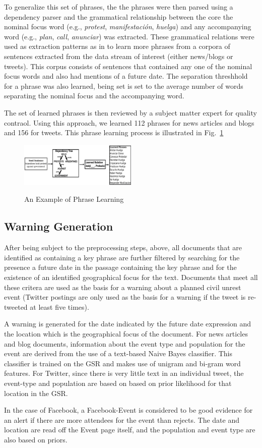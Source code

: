 To generalize this set of phrases, the the phrases were then parsed
using a dependency parser \cite{freeling} and the grammatical
relationship between the core the nominal focus word (e.g., {\em
  protest}, {\em manifestación}, {\em huelga}) and any accompanying
word (e.g., {\em plan}, {\em call}, {\em anunciar}) was
extracted. These grammatical relations were used as extraction
patterns as in \cite{riloff2003learning} to learn more phrases from a
corpora of sentences extracted from the data stream of interest
(either news/blogs or tweets). This corpus consists of sentences that
contained any one of the nominal focus words and also had mentions of
a future date. The separation threshhold for a phrase was also
learned, being set is set to the average number of words separating
the nominal focus and the accompanying word.

The set of learned phrases is then reviewed by a subject matter expert for quality contraol.  
Using this approach, we learned 112 phrases for news articles and blogs and 156 for tweets.  
This phrase learning process is illustrated in Fig.~\ref{fig:phraselearning}



\begin{figure}
\caption{An Example of Phrase Learning}
\includegraphics[width=0.5\textwidth]{figures/phraseLearning}
\label{fig:phraselearning}
\end{figure}

\subsection{Warning Generation}

After being subject to the preprocessing steps, above, all documents
that are identified as containing a key phrase are further filtered by
searching for the presence a future date in the passage containing the
key phrase and for the existence of an identified geographical focus for the text.
Documents that meet all these critera are used as the basis for a warning about a
planned civil unrest event (Twitter postings are only used as the basis for a warning
if the tweet is re-tweeted at least five times). 

A warning is generated for the date indicated by the future date
expression and the location which is the geographical focus of the
document.  For news articles and blog documents, information about
the event type and population for the event are derived from the
use of a text-based Naive Bayes classifier.  This classifier is
trained on the GSR and makes use of unigram and bi-gram word features.
For Twitter, since there is very little text in an individual tweet, the
event-type and population are based on based on prior likelihood for that location in the GSR.

In the case of Facebook, a Facebook-Event is considered to be good evidence for an alert if
there are more attendees for the event than rejects.  The date and
location are read off the Event page itself, and the population and event type are also based on priors.




